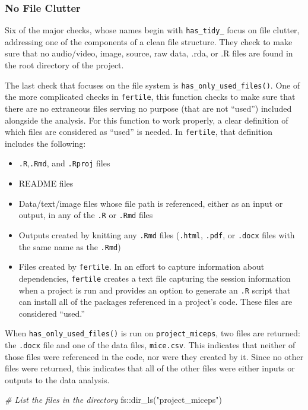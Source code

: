 \documentclass[12pt,twoside]{reedthesis}
\newenvironment{Shaded}{\begin{snugshade}}{\end{snugshade}}
\newcommand{\CommentTok}[1]{\textcolor[rgb]{0.56,0.35,0.01}{\textit{#1}}}
\newcommand{\FunctionTok}[1]{\textcolor[rgb]{0.00,0.00,0.00}{#1}}
\newcommand{\NormalTok}[1]{#1}
\newcommand{\SpecialCharTok}[1]{\textcolor[rgb]{0.00,0.00,0.00}{#1}}
\newcommand{\StringTok}[1]{\textcolor[rgb]{0.31,0.60,0.02}{#1}}
\providecommand{\tightlist}{%
  \setlength{\itemsep}{0pt}\setlength{\parskip}{0pt}}
\begin{document}
\hypertarget{no-file-clutter}{%
\subsubsection{No File Clutter}\label{no-file-clutter}}

Six of the major checks, whose names begin with \texttt{has\_tidy\_} focus on file clutter, addressing one of the components of a clean file structure. They check to make sure that no audio/video, image, source, raw data, .rda, or .R files are found in the root directory of the project.

The last check that focuses on the file system is \texttt{has\_only\_used\_files()}. One of the more complicated checks in \texttt{fertile}, this function checks to make sure that there are no extraneous files serving no purpose (that are not ``used'') included alongside the analysis. For this function to work properly, a clear definition of which files are considered as ``used'' is needed. In \texttt{fertile}, that definition includes the following:
\begin{itemize}
\tightlist
\item
  \texttt{.R},\texttt{.Rmd}, and \texttt{.Rproj} files
\item
  README files
\item
  Data/text/image files whose file path is referenced, either as an input or output, in any of the \texttt{.R} or \texttt{.Rmd} files
\item
  Outputs created by knitting any \texttt{.Rmd} files (\texttt{.html}, \texttt{.pdf}, or \texttt{.docx} files with the same name as the \texttt{.Rmd})
\item
  Files created by \texttt{fertile}. In an effort to capture information about dependencies, \texttt{fertile} creates a text file capturing the session information when a project is run and provides an option to generate an \texttt{.R} script that can install all of the packages referenced in a project's code. These files are considered ``used.''
\end{itemize}
When \texttt{has\_only\_used\_files()} is run on \texttt{project\_miceps}, two files are returned: the \texttt{.docx} file and one of the data files, \texttt{mice.csv}. This indicates that neither of those files were referenced in the code, nor were they created by it. Since no other files were returned, this indicates that all of the other files were either inputs or outputs to the data analysis.
\begin{Shaded}
\begin{Highlighting}[]
\CommentTok{\# List the files in the directory}
\NormalTok{fs}\SpecialCharTok{::}\FunctionTok{dir\_ls}\NormalTok{(}\StringTok{"project\_miceps"}\NormalTok{)}
\end{Highlighting}
\end{Shaded}
\end{document}
